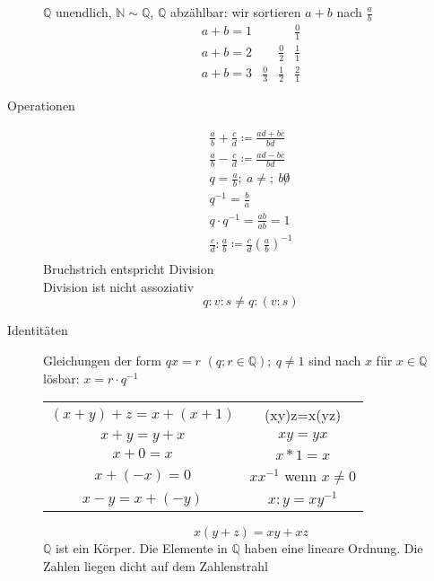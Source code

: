 \begin{description}
    $\mathbb{Q}$ unendlich, $\mathbb{N} \sim \mathbb{Q}$, $\mathbb{Q}$ abzählbar: wir sortieren $a + b$ nach $\frac{a}{b}$
    \[\begin{array}{lccc}
          a + b = 1 &             &             & \frac{0}{1} \\
          a + b = 2 &             & \frac{0}{2} & \frac{1}{1} \\
          a + b = 3 & \frac{0}{3} & \frac{1}{2} & \frac{2}{1}
    \end{array}\]
    \item[Operationen]
    \begin{gather*}
        \frac{a}{b} + \frac{c}{d} \coloneqq \frac{ad+bc}{bd}\\
        \frac{a}{b} - \frac{c}{d} \coloneqq \frac{ad-bc}{bd}\\
        q = \frac{a}{b};\ a \not =;\ b \not 0\\
        q^{-1} = \frac{b}{a}\\
        q \cdot q^{-1} = \frac{ab}{ab} = 1\\
        \frac{c}{d}:\frac{a}{b}\coloneqq\frac{c}{d}  \left(\frac{a}{b}\right)^{-1}\\
    \end{gather*}
    Bruchstrich entspricht Division \\
    Division ist nicht assoziativ
    \[q:v:s \not = q:(v:s)\]
    \item[Identitäten] Gleichungen der form $qx=r$ $(q;r \in \mathbb{Q});\ q \not = 1$ sind nach $x$ für $x\in \mathbb{Q}$ lösbar: $x = r \cdot q^{-1}$ \\
    \begin{tabular}[t]{cc}
        $(x+y)+z = x+(x+1)$ & (xy)z=x(yz)                 \\
        $x + y = y + x$     & $xy = yx$                   \\
        $x + 0 = x$         & $x * 1 = x$                 \\
        $x + (-x) = 0$      & $xx^{-1}$ wenn $x \not = 0$ \\
        $x - y = x + (-y)$  & $x:y = xy^{-1}$
    \end{tabular}
    \[x(y+z) = xy + xz\]
    $\mathbb{Q}$ ist ein Körper. Die Elemente in $\mathbb{Q}$ haben eine  lineare Ordnung. Die Zahlen liegen dicht auf dem Zahlenstrahl
\end{description}
